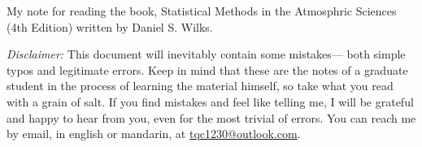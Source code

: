My note for reading the book, Statistical Methods in the Atmosphric Sciences 
(4th Edition) written by Daniel S. Wilks.

\textit{Disclaimer:} This document will inevitably contain some mistakes— both
simple typos and legitimate errors. Keep in mind that these are the notes of a
graduate student in the process of learning the material himself, so take
what you read with a grain of salt. If you find mistakes and feel like telling
me, I will be grateful and happy to hear from you, even for the most trivial of
errors. You can reach me by email, in english or mandarin, at
\href{mailto:tqc1230@outlook.com}{tqc1230@outlook.com}.
